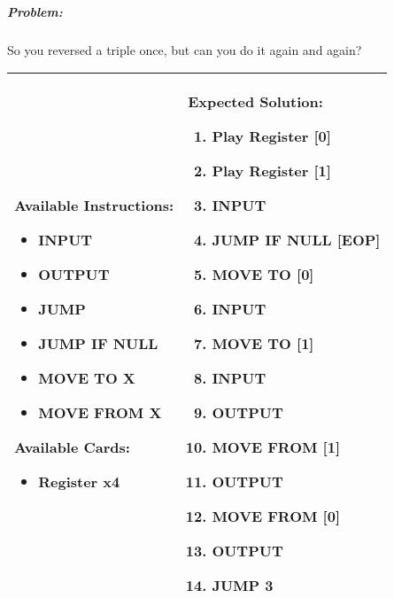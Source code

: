\subparagraph{Problem:} So you reversed a triple once, but can you do it again and again?

\begin{center}
    \begin{tabular}{ | m{6cm} | m{8cm} | } 
        \hline
            \textbf{Available Instructions:} 
            \begin{itemize}
                \setlength\itemsep{-.35em}
                \item INPUT
                \item OUTPUT
                \item JUMP
                \item JUMP IF NULL
                \item MOVE TO X
                \item MOVE FROM X
            \end{itemize}
            \textbf{Available Cards:} 
            \begin{itemize}
                \setlength\itemsep{-.35em}
                \item Register x4
            \end{itemize}& 
            \textbf{Expected Solution:} 
            \begin{enumerate}
                \setlength\itemsep{-.35em}
                \item Play Register [0]
                \item Play Register [1]
                \item INPUT
                \item JUMP IF NULL [EOP]
                \item MOVE TO [0]
                \item INPUT
                \item MOVE TO [1]
                \item INPUT
                \item OUTPUT
                \item MOVE FROM [1] 
                \item OUTPUT
                \item MOVE FROM [0]
                \item OUTPUT
                \item JUMP 3
            \end{enumerate}
            \\
        \hline
    \end{tabular}
\end{center}


